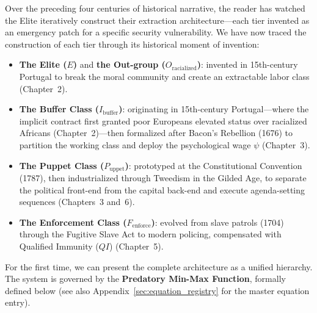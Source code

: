 \documentclass[12pt,openany]{book}
\begin{document}
Over the preceding four centuries of historical narrative, the reader has watched the Elite iteratively construct their extraction architecture---each tier invented as an emergency patch for a specific security vulnerability. We have now traced the construction of each tier through its historical moment of invention:

\begin{itemize}
    \item \textbf{The Elite ($E$)} and \textbf{the Out-group ($O_{\text{racialized}}$)}: invented in 15th-century Portugal to break the moral community and create an extractable labor class (Chapter~2).
    \item \textbf{The Buffer Class ($I_{\text{buffer}}$)}: originating in 15th-century Portugal---where the implicit contract first granted poor Europeans elevated status over racialized Africans (Chapter~2)---then formalized after Bacon's Rebellion (1676) to partition the working class and deploy the psychological wage $\psi$ (Chapter~3).
    \item \textbf{The Puppet Class ($P_{\text{uppet}}$)}: prototyped at the Constitutional Convention (1787), then industrialized through Tweedism in the Gilded Age, to separate the political front-end from the capital back-end and execute agenda-setting sequences (Chapters~3 and~6).
    \item \textbf{The Enforcement Class ($F_{\text{enforce}}$)}: evolved from slave patrols (1704) through the Fugitive Slave Act to modern policing, compensated with Qualified Immunity ($QI$) (Chapter~5).
\end{itemize}

For the first time, we can present the complete architecture as a unified hierarchy. The system is governed by the \textbf{Predatory Min-Max Function}, formally defined below (see also Appendix~\ref{sec:equation_registry} for the master equation entry).
\end{document}
